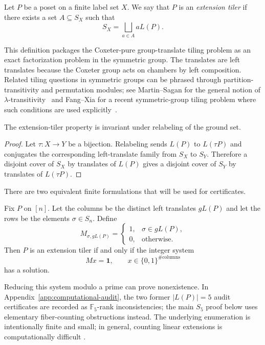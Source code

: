 \begin{definition}
Let $P$ be a poset on a finite label set $X$.  We say that $P$ is an
\emph{extension tiler} if there exists a set $A\subseteq S_X$ such that
\[
        S_X=\bigsqcup_{a\in A} aL(P).
\]
\end{definition}

This definition packages the Coxeter-pure group-translate tiling problem
as an exact factorization problem in the symmetric group.  The translates
are left translates because the Coxeter group acts on chambers by left
composition.
Related tiling questions in symmetric groups can be phrased through
partition-transitivity and permutation modules; see Martin--Sagan for the
general notion of $\lambda$-transitivity~\cite{MartinSagan2006} and
Fang--Xia for a recent symmetric-group tiling problem where such
conditions are used explicitly~\cite{FangXia2026}.

\begin{lemma}
\label{lem:relabeling-invariance}
The extension-tiler property is invariant under relabeling of the ground
set.
\end{lemma}

\begin{proof}
Let $\tau:X\to Y$ be a bijection.  Relabeling sends $L(P)$ to
$L(\tau P)$ and conjugates the corresponding left-translate family from
$S_X$ to $S_Y$.  Therefore a disjoint cover of $S_X$ by translates of
$L(P)$ gives a disjoint cover of $S_Y$ by translates of $L(\tau P)$.
\end{proof}

There are two equivalent finite formulations that will be used for
certificates.

\begin{definition}
Fix $P$ on $[n]$.  Let the columns be the distinct left translates
$gL(P)$ and let the rows be the elements $\sigma\in S_n$.  Define
\[
        M_{\sigma,gL(P)}=
        \begin{cases}
        1,& \sigma\in gL(P),\\
        0,& \text{otherwise}.
        \end{cases}
\]
Then $P$ is an extension tiler if and only if the integer system
\[
        Mx=\mathbf 1,\qquad x\in\{0,1\}^{\#\text{columns}}
\]
has a solution.
\end{definition}

Reducing this system modulo a prime can prove nonexistence.  In
Appendix~\ref{app:computational-audit}, the two former $|L(P)|=5$ audit
certificates are recorded as $\mathbb F_5$-rank inconsistencies; the main
$S_5$ proof below uses elementary fiber-counting obstructions instead.
The underlying enumeration is intentionally finite and small; in general,
counting linear extensions is computationally difficult
\cite{BrightwellWinkler1991}.

